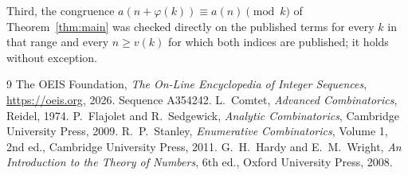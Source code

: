 \documentclass[11pt,a4paper]{article}
\theoremstyle{plain}
\theoremstyle{definition}
\begin{document}
Third, the congruence $a(n+\varphi(k))\equiv a(n)\pmod k$ of Theorem~\ref{thm:main} was
checked directly on the published terms for every $k$ in that range and every $n\ge v(k)$
for which both indices are published; it holds without exception.

\begin{thebibliography}{9}
 The OEIS Foundation, \emph{The On-Line Encyclopedia of Integer
Sequences}, \url{https://oeis.org}, 2026. Sequence A354242.
 L.~Comtet, \emph{Advanced Combinatorics}, Reidel, 1974.
 P.~Flajolet and R.~Sedgewick, \emph{Analytic Combinatorics}, Cambridge
University Press, 2009.
 R.~P.~Stanley, \emph{Enumerative Combinatorics}, Volume 1, 2nd ed.,
Cambridge University Press, 2011.
 G.~H.~Hardy and E.~M.~Wright, \emph{An Introduction to the Theory of
Numbers}, 6th ed., Oxford University Press, 2008.
\end{thebibliography}
\end{document}
